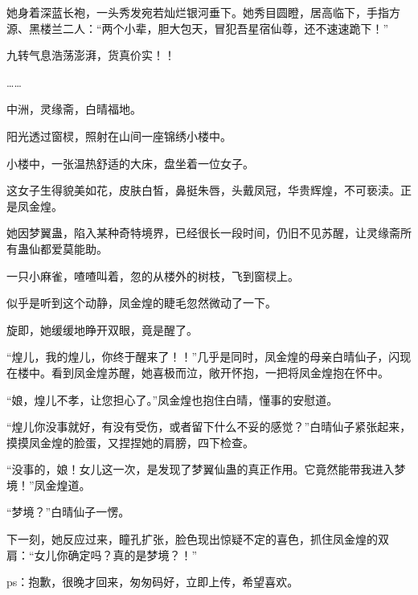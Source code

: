 \begin{this_body}
她身着深蓝长袍，一头秀发宛若灿烂银河垂下。她秀目圆瞪，居高临下，手指方源、黑楼兰二人：“两个小辈，胆大包天，冒犯吾星宿仙尊，还不速速跪下！”

九转气息浩荡澎湃，货真价实！！

……

中洲，灵缘斋，白晴福地。

阳光透过窗棂，照射在山间一座锦绣小楼中。

小楼中，一张温热舒适的大床，盘坐着一位女子。

这女子生得貌美如花，皮肤白皙，鼻挺朱唇，头戴凤冠，华贵辉煌，不可亵渎。正是凤金煌。

她因梦翼蛊，陷入某种奇特境界，已经很长一段时间，仍旧不见苏醒，让灵缘斋所有蛊仙都爱莫能助。

一只小麻雀，喳喳叫着，忽的从楼外的树枝，飞到窗棂上。

似乎是听到这个动静，凤金煌的睫毛忽然微动了一下。

旋即，她缓缓地睁开双眼，竟是醒了。

“煌儿，我的煌儿，你终于醒来了！！”几乎是同时，凤金煌的母亲白晴仙子，闪现在楼中。看到凤金煌苏醒，她喜极而泣，敞开怀抱，一把将凤金煌抱在怀中。

“娘，煌儿不孝，让您担心了。”凤金煌也抱住白晴，懂事的安慰道。

“煌儿你没事就好，有没有受伤，或者留下什么不妥的感觉？”白晴仙子紧张起来，摸摸凤金煌的脸蛋，又捏捏她的肩膀，四下检查。

“没事的，娘！女儿这一次，是发现了梦翼仙蛊的真正作用。它竟然能带我进入梦境！”凤金煌道。

“梦境？”白晴仙子一愣。

下一刻，她反应过来，瞳孔扩张，脸色现出惊疑不定的喜色，抓住凤金煌的双肩：“女儿你确定吗？真的是梦境？！”

ps：抱歉，很晚才回来，匆匆码好，立即上传，希望喜欢。

\end{this_body}

